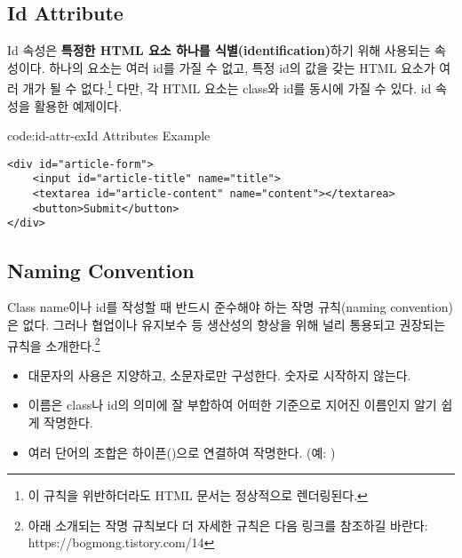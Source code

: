 \subsection*{Id Attribute}
Id 속성은 \textbf{특정한 HTML 요소 하나를 식별(identification)}하기 위해 사용되는 속성이다. 하나의 요소는 여러 id를 가질 수 없고, 특정 id의 값을 갖는 HTML 요소가 여러 개가 될 수 없다.\footnote{이 규칙을 위반하더라도 HTML 문서는 정상적으로 렌더링된다.} 다만, 각 HTML 요소는 class와 id를 동시에 가질 수 있다. \은 id 속성을 활용한 예제이다.

\begin{codeenv}{code:id-attr-ex}{Id Attributes Example}\begin{verbatim}
<div id="article-form">
    <input id="article-title" name="title">
    <textarea id="article-content" name="content"></textarea>
    <button>Submit</button>
</div>
\end{verbatim}
\end{codeenv}

\subsection*{Naming Convention}
Class name이나 id를 작성할 때 반드시 준수해야 하는 작명 규칙(naming convention)은 없다. 그러나 협업이나 유지보수 등 생산성의 향상을 위해 널리 통용되고 권장되는 규칙을 소개한다.\footnote{아래 소개되는 작명 규칙보다 더 자세한 규칙은 다음 링크를 참조하길 바란다: https://bogmong.tistory.com/14}

\begin{itemize}
    \item 대문자의 사용은 지양하고, 소문자로만 구성한다. 숫자로 시작하지 않는다.
    \item 이름은 class나 id의 의미에 잘 부합하여 어떠한 기준으로 지어진 이름인지 알기 쉽게 작명한다.
    \item 여러 단어의 조합은 하이픈(\cd{-})으로 연결하여 작명한다. (예: )
\end{itemize}
